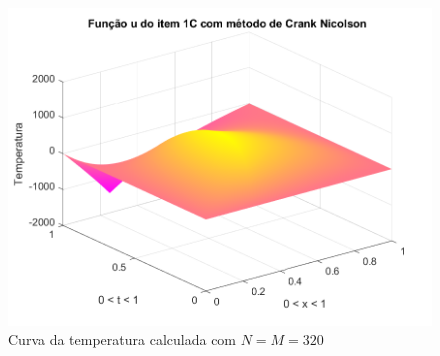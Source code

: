 \documentclass[12pt]{article}
\begin{document}
\begin{spacing}{1.5}
\begin{figure}
    \centering
    \includegraphics[width=0.8\linewidth]{Segunda_Tarefa/ItemC/nm320_calculada_C.png}
    \caption{Curva da temperatura calculada com $N=M=320$}
    \label{fig:CC_nm320_calculada}
\end{figure}

\end{spacing}
\end{document}
